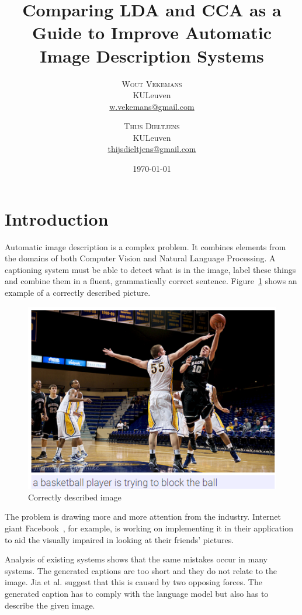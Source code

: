 \documentclass[twoside,twocolumn]{article}
\title{Comparing LDA and CCA as a Guide to Improve Automatic Image Description Systems} %
\author{%
\textsc{Wout Vekemans} \\[1ex] %
\normalsize KULeuven \\ %
\normalsize \href{mailto:w.vekemans@gmail.com}{w.vekemans@gmail.com}
\and %
\textsc{Thijs Dieltjens} \\[1ex] %
\normalsize KULeuven \\ %
\normalsize \href{mailto:thijsdieltjens@gmail.com}{thijsdieltjens@gmail.com} %
}
\date{\today} %
\begin{document}
\maketitle


\section{Introduction}
Automatic image description is a complex problem. It combines elements from the domains of both Computer Vision and Natural Language Processing. A captioning system must be able to detect what is in the image, label these things and combine them in a fluent, grammatically correct sentence. Figure~\ref{fig:exampledescription} shows an example of a correctly described picture.

\begin{figure}[!htb]
    \centering
    \includegraphics[width=\linewidth]{blocking_the_ball_trimmed.png}
    \caption{Correctly described image}
    \label{fig:exampledescription}
\end{figure}

The problem is drawing more and more attention from the industry. Internet giant Facebook~\cite{facebook}, for example, is working on implementing it in their application to aid the visually impaired in looking at their friends' pictures.

Analysis of existing systems shows that the same mistakes occur in many systems. The generated captions are too short and they do not relate to the image. Jia et al.\cite{Fernando2015} suggest that this is caused by two opposing forces. The generated caption has to comply with the language model but also has to describe the given image.
\end{document}
